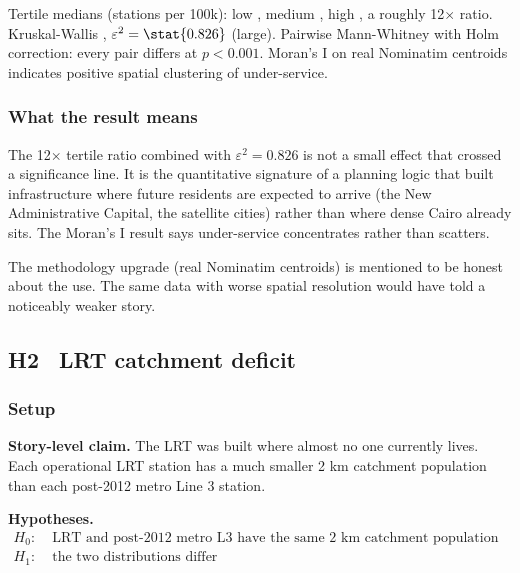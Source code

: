 Tertile medians (stations per 100k): low , medium
, high , a roughly 12$\times$ ratio. Kruskal-Wallis
, $\varepsilon^2 = \stat{0.826}$
(large). Pairwise Mann-Whitney with Holm correction: every pair
differs at $p < 0.001$. Moran's I on real Nominatim centroids
indicates positive spatial clustering of under-service.


\subsubsection{What the result means}

\begin{callout}
The 12$\times$ tertile ratio combined with $\varepsilon^2 = 0.826$ is
not a small effect that crossed a significance line. It is the
quantitative signature of a planning logic that built infrastructure
where future residents are expected to arrive (the New Administrative
Capital, the satellite cities) rather than where dense Cairo already
sits. The Moran's I result says under-service concentrates rather
than scatters.

The methodology upgrade (real Nominatim centroids) is mentioned to
be honest about the use. The same data with worse spatial
resolution would have told a noticeably weaker story.
\end{callout}

\subsection{H2 \textbullet\ LRT catchment deficit}
\label{sec:h2}

\subsubsection{Setup}

\textbf{Story-level claim.} The LRT was built where almost no one
currently lives. Each operational LRT station has a much smaller 2 km
catchment population than each post-2012 metro Line 3 station.

\textbf{Hypotheses.}
\begin{align*}
 H_0:\;& \text{LRT and post-2012 metro L3 have the same 2 km catchment population distribution} \\
 H_1:\;& \text{the two distributions differ}
\end{align*}

